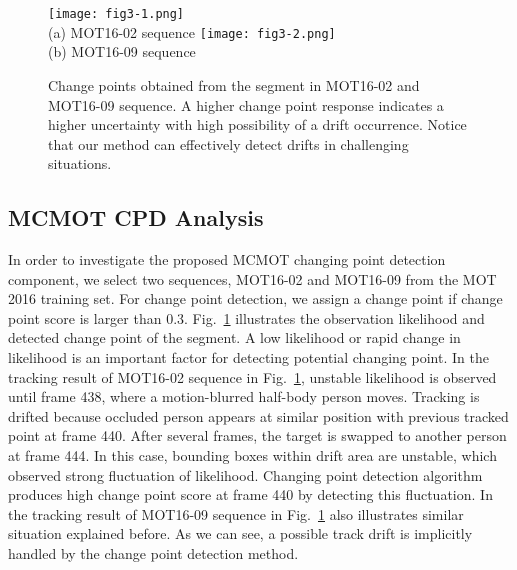 \documentclass[runningheads]{llncs}
\begin{document}
\begin{figure}[t!]
\centering
\texttt{[image: fig3-1.png]} \\
(a) MOT16-02 sequence
\texttt{[image: fig3-2.png]} \\
(b) MOT16-09 sequence
\caption{Change points obtained from the segment in MOT16-02 and MOT16-09 sequence. A higher change point response indicates a higher uncertainty with high possibility of a drift occurrence. Notice that our method can effectively detect drifts in challenging situations.}
\label{fig:3}
\end{figure}

\subsection{MCMOT CPD Analysis}

In order to investigate the proposed MCMOT changing point detection component, we select two sequences, MOT16-02 and MOT16-09 from the MOT 2016 training set. For change point detection, we assign a change point if change point score is larger than 0.3. Fig.~\ref{fig:3} illustrates the observation likelihood and detected change point of the segment. A low likelihood or rapid change in likelihood is an important factor for detecting potential changing point. In the tracking result of MOT16-02 sequence in Fig.~\ref{fig:3}, unstable likelihood is observed until frame 438, where a motion-blurred half-body person moves. Tracking is drifted because occluded person appears at similar position with previous tracked point at frame 440. After several frames, the target is swapped to another person at frame 444. In this case, bounding boxes within drift area are unstable, which observed strong fluctuation of likelihood. Changing point detection algorithm produces high change point score at frame 440 by detecting this fluctuation. In the tracking result of MOT16-09 sequence in Fig.~\ref{fig:3} also illustrates similar situation explained before. As we can see, a possible track drift is implicitly handled by the change point detection method. 
\end{document}
